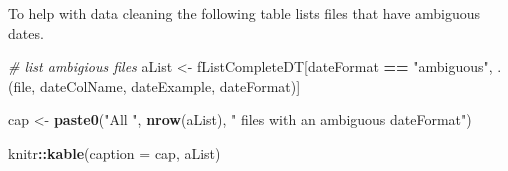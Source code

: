 \documentclass[]{article}
\newenvironment{Shaded}{\begin{snugshade}}{\end{snugshade}}
\newcommand{\KeywordTok}[1]{\textcolor[rgb]{0.13,0.29,0.53}{\textbf{#1}}}
\newcommand{\DataTypeTok}[1]{\textcolor[rgb]{0.13,0.29,0.53}{#1}}
\newcommand{\StringTok}[1]{\textcolor[rgb]{0.31,0.60,0.02}{#1}}
\newcommand{\CommentTok}[1]{\textcolor[rgb]{0.56,0.35,0.01}{\textit{#1}}}
\newcommand{\OperatorTok}[1]{\textcolor[rgb]{0.81,0.36,0.00}{\textbf{#1}}}
\newcommand{\NormalTok}[1]{#1}
\begin{document}
To help with data cleaning the following table lists files that have
ambiguous dates.

\begin{Shaded}
\begin{Highlighting}[]
\CommentTok{# list ambigious files}
\NormalTok{aList <-}\StringTok{ }\NormalTok{fListCompleteDT[dateFormat }\OperatorTok{==}\StringTok{ "ambiguous"}\NormalTok{, }
\NormalTok{                         .(file, dateColName, dateExample, dateFormat)]}

\NormalTok{cap <-}\StringTok{ }\KeywordTok{paste0}\NormalTok{(}\StringTok{"All "}\NormalTok{, }\KeywordTok{nrow}\NormalTok{(aList), }
              \StringTok{" files with an ambiguous dateFormat"}\NormalTok{)}

\NormalTok{knitr}\OperatorTok{::}\KeywordTok{kable}\NormalTok{(}\DataTypeTok{caption =}\NormalTok{ cap, aList)}
\end{Highlighting}
\end{Shaded}
\end{document}
